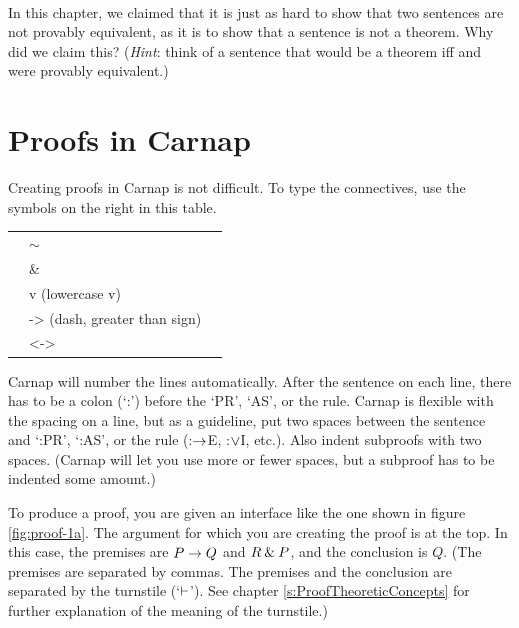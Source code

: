 \

\problempart In this chapter, we claimed that it is just as hard to show that two sentences are not provably equivalent, as it is to show that a sentence is not a theorem. Why did we claim this? (\emph{Hint}: think of a sentence that would be a theorem iff  and  were provably equivalent.)




\chapter{Proofs in Carnap}\label{s:Carnap-proofs}

Creating proofs in Carnap is not difficult. To type the connectives, use the symbols on the right in this table. 

	\begin{table}[h]
	\center
	\begin{tabular}{p{1cm} l l}
	
	\hline
	\enot&$\sim$&\\
	\eand&\&&\\
	\eor&v (lowercase v)&\\
	\eif&-> (dash, greater than sign)&\\
	\eiff&<->&\\
	\hline
	\end{tabular}
	\end{table}

\noindent Carnap will number the lines automatically. After the sentence on each line, there has to be a colon (`:') before the `PR', `AS', or the rule. Carnap is flexible with the spacing on a line, but as a guideline, put two spaces between the sentence and `:PR', `:AS', or the rule (:$\rightarrow$E, :$\vee$I, etc.). Also indent subproofs with two spaces. (Carnap will let you use more or fewer spaces, but a subproof has to be indented some amount.)

To produce a proof, you are given an interface like the one shown in figure \ref{fig:proof-1a}. The argument for which you are creating the proof is at the top. In this case, the premises are $P \rightarrow Q$ and $R \mathbin{\&} P$, and the conclusion is $Q$. (The premises are separated by commas. The premises and the conclusion are separated by the turnstile (`$\vdash$'). See chapter \ref{s:ProofTheoreticConcepts} for further explanation of the meaning of the turnstile.)

